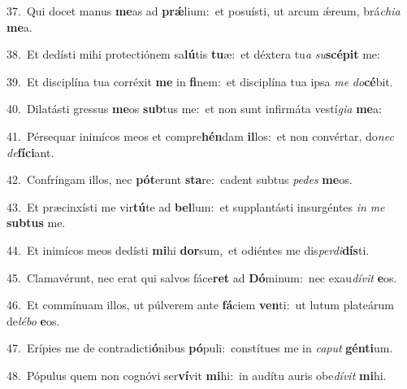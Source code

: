 {\numbfont\textcolor{\numbcolor}{37.}}~Qui docet manus \textbf{me}\-as ad \textbf{prǽ}\-lium:~\star et posuísti, ut arcum ǽreum, brá\-\textit{chi}\-\textit{a} \textbf{me}\-a.\par
{\numbfont\textcolor{\numbcolor}{38.}}~Et dedísti mihi protectiónem sa\-\textbf{lú}\-tis \textbf{tu}\-æ:~\star et déxtera tu\textit{a} \textit{su}\-\textbf{scé}\textbf{pit} me:\par
{\numbfont\textcolor{\numbcolor}{39.}}~Et disciplína tua corréxit \textbf{me} in \textbf{fi}\-nem:~\star et disciplína tua ipsa \textit{me} \textit{do}\-\textbf{cé}bit.\par
{\numbfont\textcolor{\numbcolor}{40.}}~Dilatásti gressus \textbf{me}\-os \textbf{sub}\-tus me:~\star et non sunt infirmáta vestí\-\textit{gi}\-\textit{a} \textbf{me}\-a:\par
{\numbfont\textcolor{\numbcolor}{41.}}~Pérsequar inimícos meos et compre\-\textbf{hén}\-dam \textbf{il}\-los:~\star et non convértar, do\textit{nec} \textit{de}\-\textbf{fí}\textbf{ci}ant.\par
{\numbfont\textcolor{\numbcolor}{42.}}~Confríngam illos, nec \textbf{pót}\-erunt \textbf{sta}\-re:~\star cadent subtus \textit{pe}\-\textit{des} \textbf{me}\-os.\par
{\numbfont\textcolor{\numbcolor}{43.}}~Et præcinxísti me vir\-\textbf{tú}\-te ad \textbf{bel}\-lum:~\star et supplantásti insurgéntes \textit{in} \textit{me} \textbf{sub}\-\textbf{tus} me.\par
{\numbfont\textcolor{\numbcolor}{44.}}~Et inimícos meos dedísti \textbf{mi}\-hi \textbf{dor}\-sum,~\star et odiéntes me dis\-\textit{per}\-\textit{di}\textbf{dís}ti.\par
{\numbfont\textcolor{\numbcolor}{45.}}~Clamavérunt, nec erat qui salvos fáce\textbf{ret} ad \textbf{Dó}\-minum:~\star nec exau\-\textit{dí}\-\textit{vit} \textbf{e}\-os.\par
{\numbfont\textcolor{\numbcolor}{46.}}~Et commínuam illos, ut púlverem ante \textbf{fá}\-ciem \textbf{ven}\-ti:~\star ut lutum plateárum de\-\textit{lé}\-\textit{bo} \textbf{e}\-os.\par
{\numbfont\textcolor{\numbcolor}{47.}}~Erípies me de contradicti\-\textbf{ó}\-nibus \textbf{pó}\-puli:~\star constítues me in \textit{ca}\-\textit{put} \textbf{gén}\-\textbf{ti}um.\par
{\numbfont\textcolor{\numbcolor}{48.}}~Pópulus quem non cognóvi ser\-\textbf{ví}\-vit \textbf{mi}\-hi:~\star in audítu auris obe\-\textit{dí}\-\textit{vit} \textbf{mi}\-hi.\par
